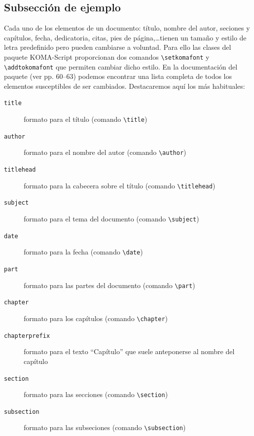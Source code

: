 \documentclass{scrartcl}
\begin{document}
\subsection{Subsección de ejemplo}
Cada uno de los elementos de un documento: título, nombre del autor, seciones y capítulos, fecha, dedicatoria, citas, pies de página,\ldots tienen un tamaño y estilo de letra predefinido pero pueden cambiarse a voluntad. Para ello las clases del paquete KOMA-Script proporcionan dos comandos \verb+\setkomafont+ y \verb+\addtokomafont+ que permiten cambiar dicho estilo. En la documentación del paquete (ver pp. 60--63) podemos encontrar una lista completa de todos los elementos susceptibles de ser cambiados. Destacaremos aquí los más habituales:
\begin{description}
  \item[\texttt{title}] formato para el título (comando \verb+\title+)
  \item[\texttt{author}] formato para el nombre del autor (comando \verb+\author+) 
  \item[\texttt{titlehead}] formato para la cabecera sobre el título (comando \verb+\titlehead+)
  \item[\texttt{subject}] formato para el tema del documento (comando \verb+\subject+)
  \item[\texttt{date}] formato para la fecha (comando \verb+\date+)
  \item[\texttt{part}] formato para las partes del documento (comando \verb+\part+)
  \item[\texttt{chapter}] formato para los capítulos (comando \verb+\chapter+)
  \item[\texttt{chapterprefix}] formato para el texto ``Capítulo'' que suele anteponerse al nombre del capítulo 
  \item[\texttt{section}] formato para las secciones (comando \verb+\section+)
  \item[\texttt{subsection}] formato para las subseciones (comando \verb+\subsection+)

\end{description}
\end{document}
